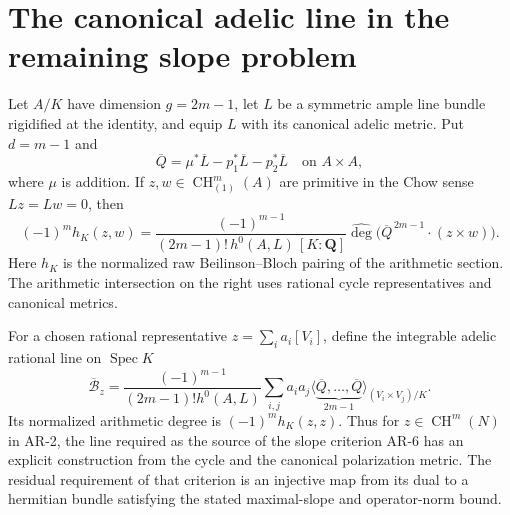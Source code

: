 \section{The canonical adelic line in the remaining slope problem}
\label{sec:AR10}

\begin{theorem}
Let $A/K$ have dimension $g=2m-1$, let $L$ be a symmetric ample line
bundle rigidified at the identity, and equip $L$ with its canonical
adelic metric. Put $d=m-1$ and
\[
 \overline Q=\mu^*\overline L-p_1^*\overline L-p_2^*\overline L
 \quad\text{on }A\times A,
\]
where $\mu$ is addition. If $z,w\in\operatorname{CH}^m_{(1)}(A)$
are primitive in the Chow sense $Lz=Lw=0$, then
\begin{equation}\label{eq:AR10}
 (-1)^m h_K(z,w)=
 \frac{(-1)^{m-1}}{(2m-1)!\,h^0(A,L)\,[K:\mathbf Q]}
 \widehat{\deg}\bigl(\overline Q^{\,2m-1}\cdot(z\times w)\bigr).
\end{equation}
Here $h_K$ is the normalized raw Beilinson--Bloch pairing of the
arithmetic section. The arithmetic intersection on the right uses
rational cycle representatives and canonical metrics.

For a chosen rational representative $z=\sum_i a_i[V_i]$, define the
integrable adelic rational line on $\operatorname{Spec}K$
\[
 \overline{\mathcal B}_z=
 \frac{(-1)^{m-1}}{(2m-1)!h^0(A,L)}
 \sum_{i,j}a_i a_j
 \bigl\langle\underbrace{\overline Q,\ldots,\overline Q}_{2m-1}
 \bigr\rangle_{(V_i\times V_j)/K}.
\]
Its normalized arithmetic degree is $(-1)^m h_K(z,z)$. Thus for
$z\in\operatorname{CH}^m(N)$ in AR-2, the line required as the source
of the slope criterion AR-6 has an explicit construction from the
cycle and the canonical polarization metric. The residual requirement
of that criterion is an injective map from its dual to a hermitian
bundle satisfying the stated maximal-slope and operator-norm bound.
\end{theorem}

